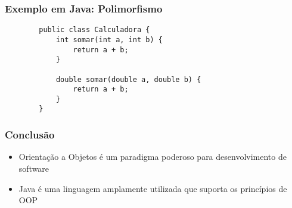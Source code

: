\begin{frame}[fragile]
	\frametitle{Exemplo em Java: Polimorfismo}
	\begin{verbatim}
		public class Calculadora {
			int somar(int a, int b) {
				return a + b;
			}
			
			double somar(double a, double b) {
				return a + b;
			}
		}
	\end{verbatim}
\end{frame}

\begin{frame}
	\frametitle{Conclusão}
	\begin{itemize}
		\item Orientação a Objetos é um paradigma poderoso para desenvolvimento de software
		\item Java é uma linguagem amplamente utilizada que suporta os princípios de OOP
	\end{itemize}
\end{frame}